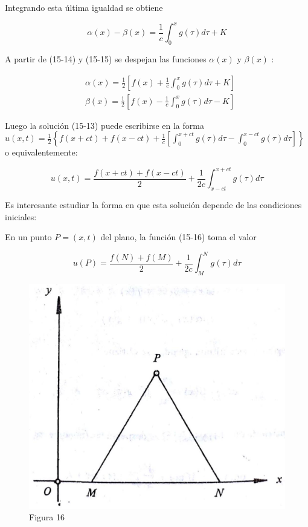 \documentclass[10pt]{article}
\theoremstyle{plain}
\theoremstyle{definition}
\theoremstyle{remark}
\begin{document}
Integrando esta última igualdad se obtiene


\begin{equation*}
\alpha(x)-\beta(x)=\frac{1}{c} \int_{0}^{x} g(\tau) d \tau+K \tag{15-15}
\end{equation*}


A partir de (15-14) y (15-15) se despejan las funciones $\alpha(x)$ y $\beta(x)$ :

$$
\begin{aligned}
& \alpha(x)=\frac{1}{2}\left[f(x)+\frac{1}{c} \int_{0}^{x} g(\tau) d \tau+K\right] \\
& \beta(x)=\frac{1}{2}\left[f(x)-\frac{1}{c} \int_{0}^{x} g(\tau) d \tau-K\right]
\end{aligned}
$$

Luego la solución (15-13) puede escribirse en la forma $u(x, t)=\frac{1}{2}\left\{f(x+c t)+f(x-c t)+\frac{1}{c}\left[\int_{0}^{x+c t} g(\tau) d \tau-\int_{0}^{x-c t} g(\tau) d \tau\right]\right\}$ o equivalentemente:


\begin{equation*}
u(x, t)=\frac{f(x+c t)+f(x-c t)}{2}+\frac{1}{2 c} \int_{x-c t}^{x+c t} g(\tau) d \tau \tag{15-16}
\end{equation*}


Es interesante estudiar la forma en que esta solución depende de las condiciones iniciales:

En un punto $P=(x, t)$ del plano, la función (15-16) toma el valor

$$
u(P)=\frac{f(N)+f(M)}{2}+\frac{1}{2 c} \int_{M}^{N} g(\tau) d \tau
$$

\begin{figure}[h]
\begin{center}
  \includegraphics[width=\textwidth]{2025_09_05_adecef5eb2053bc129b5g-357}
\captionsetup{labelformat=empty}
\caption{Figura 16}
\end{center}
\end{figure}
\end{document}
